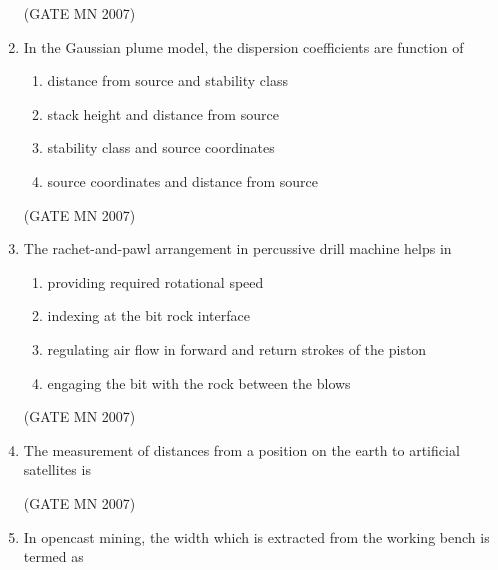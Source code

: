 \documentclass[journal]{IEEEtran}
\begin{document}
\begin{enumerate}
\hfill (GATE MN 2007)

\item In the Gaussian plume model, the dispersion coefficients are function of
\begin{enumerate}
		
    \item distance from source and stability class
    \item stack height and distance from source
    \item stability class and source coordinates
    \item source coordinates and distance from source
	    
\end{enumerate}

\hfill (GATE MN 2007)

\item The rachet-and-pawl arrangement in percussive drill machine helps in
\begin{enumerate}
		
    \item providing required rotational speed
    \item indexing at the bit rock interface
    \item regulating air flow in forward and return strokes of the piston
    \item engaging the bit with the rock between the blows
	    
\end{enumerate}

\hfill (GATE MN 2007)

\item The measurement of distances from a position on the earth to artificial satellites is
\begin{enumerate}
\end{enumerate}

\hfill (GATE MN 2007)

\item In opencast mining, the width which is extracted from the working bench is termed as
\begin{enumerate}
\end{enumerate}


\end{enumerate}
\end{document}
